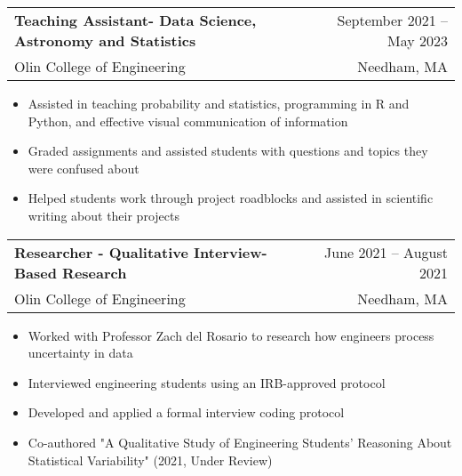 \documentclass[letterpaper,10pt]{article}
\makeatletter
\newcommand{\resumeItem}[1]{
  \item\small{
    {#1\vspace{-2pt}}
  }
}
\newcommand{\resumeSubheading}[4]{
  \vspace{-2pt}\item
    \begin{tabular*}{0.97\textwidth}[t]{l@{\extracolsep{\fill}}r}
      \textbf{#1} & #2 \\
      \small#3 & \small #4 \\
    \end{tabular*}\vspace{-7pt}
}
\newcommand{\resumeSubSubheading}[2]{
    \item
    \begin{tabular*}{0.97\textwidth}{l@{\extracolsep{\fill}}r}
      \textit{\small#1} & \textit{\small #2} \\
    \end{tabular*}\vspace{-7pt}
}
\newcommand{\resumeSubHeadingListEnd}{\end{itemize}}
\newcommand{\resumeItemListStart}{\begin{itemize}}
\newcommand{\resumeItemListEnd}{\end{itemize}\vspace{-5pt}}
\makeatother
\begin{document}



    \resumeSubheading
      {Teaching Assistant- Data Science, Astronomy and Statistics}{September 2021 -- May 2023}
      {Olin College of Engineering}{Needham, MA}
      \resumeItemListStart
        \resumeItem{Assisted in teaching probability and statistics, programming in R and Python, and effective visual communication of information}
        \resumeItem{Graded assignments and assisted students with questions and topics they were confused about}
        \resumeItem{Helped students work through project roadblocks and assisted in scientific writing about their projects}
    \resumeItemListEnd

    \resumeSubheading
      {Researcher - Qualitative Interview-Based Research}{June 2021 -- August 2021}
      {Olin College of Engineering}{Needham, MA}
      \resumeItemListStart
        \resumeItem{Worked with Professor Zach del Rosario to research how engineers process uncertainty in data}
        \resumeItem{Interviewed engineering students using an IRB-approved protocol}
        \resumeItem{Developed and applied a formal interview coding protocol}
        \resumeItem{Co-authored "A Qualitative Study of Engineering Students’ Reasoning About Statistical Variability" (2021, Under Review)}
    \resumeItemListEnd
\end{document}
